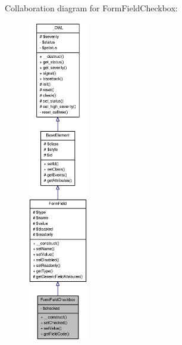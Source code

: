 Collaboration diagram for FormFieldCheckbox:\nopagebreak
\begin{figure}[H]
\begin{center}
\leavevmode
\includegraphics[height=400pt]{classFormFieldCheckbox__coll__graph}
\end{center}
\end{figure}
